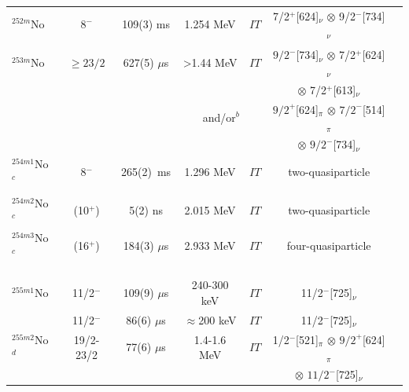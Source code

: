 \begin{center}
\begin{longtable}{lcccccl}
$^{252m}$No&      8$^-$  & 109(3) ms  &1.254 MeV& $IT$   &
                      7/2$^+$[624]$_\nu$ $\otimes$ 9/2$^-$[734]$_\nu$ & \cite{Sulignano2007}\\
          &        &         &         &            &                & \cite{Sulignano2012}\\
$^{253m}$No& $\geq23/2$  & 627(5) $\mu$s  & >1.44 MeV& $IT$   & 
            $9/2^-$[734]$_\nu$ $\otimes$ 7/2$^+$[624]$_\nu$& \cite{Streicher2006}\\ 
        &        &         &         &            & $\otimes$ 7/2$^+$[613]$_\nu$               & \cite{Lopez-Martens2007}\\
            &&&\multicolumn{2}{c}{and/or$^b$} &$9/2^+$[624]$_\pi$ $\otimes$ $7/2^-$[514]$_\pi$
                                                                    & \cite{Streicher2010}\\ 
          &        &         &         &            & $\otimes$ $9/2^-$[734]$_\nu$               & \cite{Antalic2011}\\
$^{254m1}$No$^c$&   8$^-$ &265(2)~ms &   1.296 MeV   &$IT$ & two-quasiparticle            & \cite{Herzberg2006}\\
          &        &         &         &            &                & \cite{Wahid2025}\\
$^{254m2}$No$^c$&   (10$^+$)&5(2) ns& 2.015 MeV&$IT$ & two-quasiparticle  & \cite{Wahid2025}\\
$^{254m3}$No$^c$&   (16$^+$)&184(3) $\mu$s& 2.933 MeV&$IT$ & four-quasiparticle  & \cite{Tandel2006}\\
          &        &         &         &            &                & \cite{Clark2010}\\
          &        &         &         &            &                & \cite{Hessberger2010}\\
          &        &         &         &            &                & \cite{Wahid2025}\\
$^{255m1}$No&  11/2$^-$ & 109(9) $\mu$s & 240-300 keV& $IT$   & 
             11/2$^-$[725]$_\nu$& \cite{Bronis2022}\\
    &  11/2$^-$ & 86(6) $\mu$s  & $\approx$200 keV& $IT$   & 
             11/2$^-$[725]$_\nu$& \cite{Kessaci2022}\\
$^{255m2}$No$^d$& 19/2-23/2 & 77(6) $\mu$s  & 1.4-1.6 MeV& $IT$   & 
            1/2$^-$[521]$_\pi$ $\otimes$ $9/2^+$[624]$_\pi$& \cite{Bronis2022}\\
          &        &         &         &            &      $\otimes$ $11/2^-$[725]$_\nu$&\\  

\end{longtable}
\end{center}
